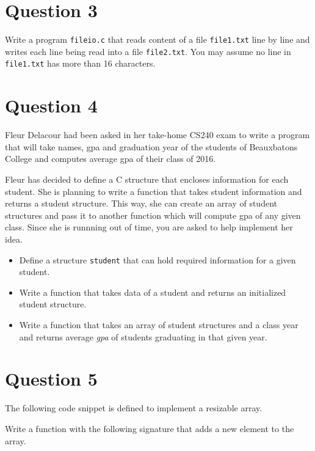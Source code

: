 \documentclass[12pt,letterpaper,twoside]{article}
\begin{document}
\section*{Question 3}

Write a program \texttt{fileio.c} that reads content of a file \texttt{file1.txt} line by line and writes each line being read into a file \texttt{file2.txt}.
You may assume no line in \texttt{file1.txt} has more than 16 characters.

\section*{Question 4}

Fleur Delacour had been asked in her take-home CS240 exam to write a program that will take names, gpa and graduation year of the students of Beauxbatons College and computes average gpa of their class of 2016.

Fleur has decided to define a C structure that encloses information for each student.
She is planning to write a function that takes student information and returns a student structure.
This way, she can create an array of student structures and pass it to another function which will compute gpa of any given class.
Since she is runnning out of time, you are asked to help implement her idea.

\begin{itemize}
\item Define a structure \texttt{student} that can hold required information for a given student.
\item Write a function that takes data of a student and returns an initialized student structure.
\item Write a function that takes an array of student structures and a class year and returns average \textit{gpa} of students graduating in that given year.
\end{itemize}

\section*{Question 5}

The following code snippet is defined to implement a resizable array.

\lstset{language=c,tabsize=4}


Write a function with the following signature that adds a new element to the array.

\lstset{language=c,tabsize=4}

\end{document}
